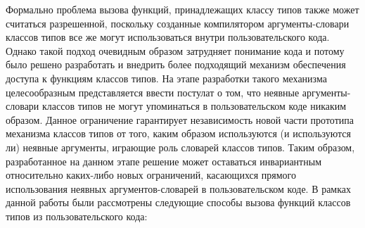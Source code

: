 Формально проблема вызова функций, принадлежащих классу типов также может считаться разрешенной, поскольку созданные компилятором аргументы-словари классов типов все же могут использоваться внутри пользовательского кода. Однако такой подход очевидным образом затрудняет понимание кода и потому было решено разработать и внедрить более подходящий механизм обеспечения доступа к функциям классов типов. На этапе разработки такого механизма целесообразным представляется ввести постулат о том, что неявные аргументы-словари классов типов не могут упоминаться в пользовательском коде никаким образом. Данное ограничение гарантирует независимость новой части прототипа механизма классов типов от того, каким образом используются (и используются ли) неявные аргументы, играющие роль словарей классов типов. Таким образом, разработанное на данном этапе решение может оставаться инвариантным относительно каких-либо новых ограничений, касающихся прямого использования неявных аргументов-словарей в пользовательском коде. В рамках данной работы были рассмотрены следующие способы вызова функций классов типов из пользовательского кода:
